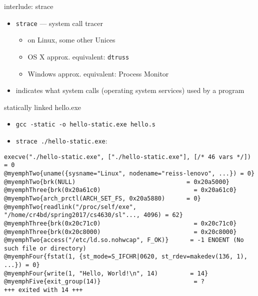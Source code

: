 \begin{frame}{interlude: strace}
\begin{itemize}
\item {\tt strace} --- system call tracer
    \begin{itemize}
    \item on Linux, some other Unices
    \item OS X approx. equivalent: {\tt dtruss}
    \item Windows approx. equivalent: Process Monitor
    \end{itemize}
\item indicates what system calls (operating system services) used by a program
\end{itemize}
\end{frame}

\begin{frame}[fragile,label=staticStrace]{statically linked hello.exe}
\begin{itemize}
\item \small{\tt gcc -static -o hello-static.exe hello.s}
\item \small{\tt strace ./hello-static.exe}:
\end{itemize}
\begin{Verbatim}[commandchars=@\{\},fontsize=\fontsize{8}{9}\selectfont]
execve("./hello-static.exe", ["./hello-static.exe"], [/* 46 vars */]) = 0
@myemphTwo{uname({sysname="Linux", nodename="reiss-lenovo", ...}) = 0}
@myemphTwo{brk(NULL)                               = 0x20a5000}
@myemphThree{brk(0x20a61c0)                          = 0x20a61c0}
@myemphTwo{arch_prctl(ARCH_SET_FS, 0x20a5880)      = 0}
@myemphTwo{readlink("/proc/self/exe", "/home/cr4bd/spring2017/cs4630/sl"..., 4096) = 62}
@myemphThree{brk(0x20c71c0)                          = 0x20c71c0}
@myemphThree{brk(0x20c8000)                          = 0x20c8000}
@myemphTwo{access("/etc/ld.so.nohwcap", F_OK)}      = -1 ENOENT (No such file or directory)
@myemphFour{fstat(1, {st_mode=S_IFCHR|0620, st_rdev=makedev(136, 1), ...}) = 0}
@myemphFour{write(1, "Hello, World!\n", 14)         = 14}
@myemphFive{exit_group(14)}                          = ?
+++ exited with 14 +++
\end{Verbatim}
\end{frame}
